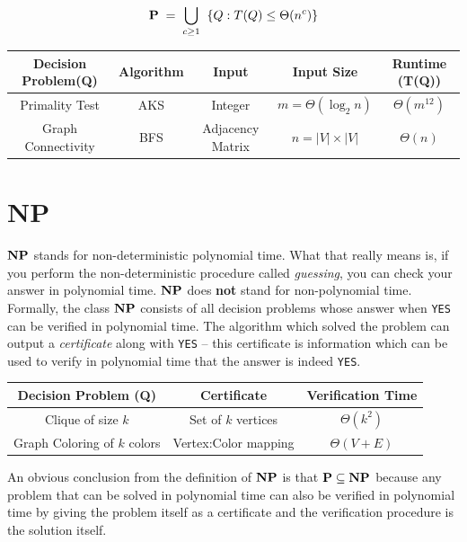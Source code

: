 \[
\mathbf{P} \; = \; \bigcup_{c\ge1} \;\; \{Q: T(Q) \le \Theta(n^c)\}
\]

\begin{center}
\begin{tabular}{|c|c|c|c|c|}
\hline
\textbf{Decision Problem(Q)} & \textbf{Algorithm} & \textbf{Input} & \textbf{Input Size} & \textbf{Runtime (T(Q))} \\
\hline
Primality Test & AKS & Integer & $m=\Theta(\log_2 n)$  & $\Theta(m^{12})$ \\
Graph Connectivity & BFS & Adjacency Matrix & $n=|V|\times|V|$ & $\Theta(n)$ \\
\hline
\end{tabular}
\end{center}

\section{NP}

$\mathbf{NP}$ stands for non-deterministic polynomial time. What that really means is, if you perform the 
non-deterministic procedure called \emph{guessing}, you can check your answer in polynomial time. $\mathbf{NP}$ 
does \textbf{not} stand for non-polynomial time. Formally, the class $\mathbf{NP}$ consists of all decision 
problems whose answer when \texttt{YES} can be verified in polynomial time. The algorithm which 
solved the problem can output a \emph{certificate} along with \texttt{YES} -- this certificate is 
information which can be used to verify in polynomial time that the answer is indeed \texttt{YES}. 


\begin{center}
\begin{tabular}{|c|c|c|}
\hline
\textbf{Decision Problem (Q)} & \textbf{Certificate} & \textbf{Verification Time} \\
\hline
Clique of size $k$ & Set of $k$ vertices & $\Theta(k^2)$ \\

Graph Coloring of $k$ colors & Vertex\;:\;Color mapping & $\Theta(V+E)$ \\
\hline
\end{tabular}
\end{center}

An obvious conclusion from the definition of $\mathbf{NP}$ is that $\mathbf{P}\subseteq \mathbf{NP}$ because any problem that can be 
solved in polynomial time can also be verified in polynomial time by giving the problem itself as a 
certificate and the verification procedure is the solution itself.

